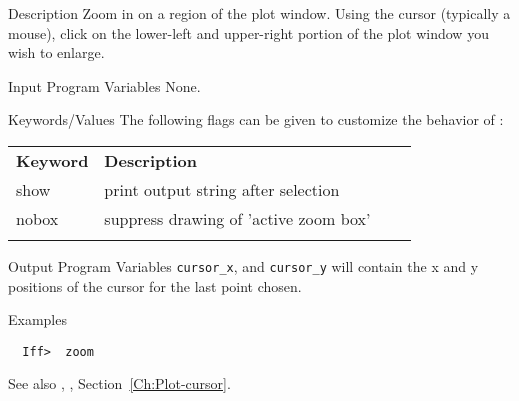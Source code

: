
\begin{IFFcom}
\item[Description] Zoom in on a region of the plot window.  Using the
  cursor (typically a mouse),  click on the lower-left and upper-right
  portion of the plot window you wish to enlarge. 
\item[Input Program Variables] None.
\item[Keywords/Values] 
The following flags can be given to customize the behavior of
{}:

{\relax \hspace{0.25truein}\par\noindent\relax}
\begin{tabular}{llrl}
  \textbf{Keyword} &  \textbf{Description}\\
  \noalign{\smallskip}
  {show}       & print output string after selection\\
  {nobox}      & suppress drawing of 'active zoom box'\\
  \noalign{\smallskip}
\end{tabular}
\noindent

\item[Output Program Variables] {\texttt{cursor\_x}}, and
  {\texttt{cursor\_y}} will contain the x and y positions of the cursor for
  the last point chosen.
\item[Examples] {\hspace{1.in} \vspace{-0.1truein} \relax }
\begin{verbatim} 
  Iff>  zoom
\end{verbatim}
\item[See also] {}, {}, 
Section~\ref{Ch:Plot-cursor}.
\end{IFFcom}
